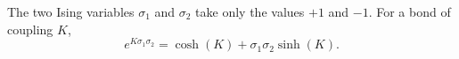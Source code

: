 \documentclass{article}
\begin{document}
The two Ising variables $\sigma_1$ and $\sigma_2$ take only the values $+1$ and $-1$. For a bond of coupling $K$,
\begin{equation}
e^{K\sigma_1\sigma_2} = \cosh(K) + \sigma_1\sigma_2 \sinh(K) .
\label{eq:ht}
\end{equation}
\end{document}
